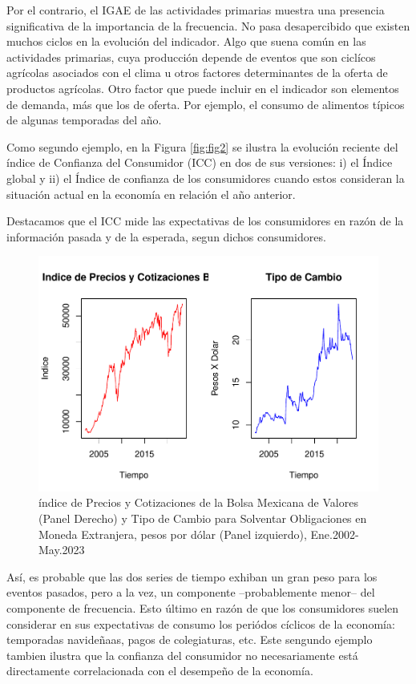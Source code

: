 \documentclass[
]{book}
\begin{document}
Por el contrario, el IGAE de las actividades primarias muestra una presencia significativa de la importancia de la frecuencia. No pasa desapercibido que existen muchos ciclos en la evolución del indicador. Algo que suena común
en las actividades primarias, cuya producción depende de eventos que son ciclícos agrícolas asociados con el clima u otros factores determinantes de la oferta de productos agrícolas. Otro factor que puede incluir en el indicador
son elementos de demanda, más que los de oferta. Por ejemplo, el consumo de alimentos típicos de algunas temporadas del año.

Como segundo ejemplo, en la Figura \ref{fig:fig2} se ilustra la evolución reciente del índice de Confianza del Consumidor (ICC) en dos de sus versiones: i) el Índice global y ii) el Índice de confianza de los consumidores cuando estos consideran la situación actual en la economía en relación el año anterior.

Destacamos que el ICC mide las expectativas de los consumidores en razón de la información pasada y de la esperada, segun dichos consumidores.

\begin{figure}

{\centering \includegraphics{bookdown-demo_files/figure-latex/fig3-1} 

}

\caption{índice de Precios y Cotizaciones de la Bolsa Mexicana de Valores (Panel Derecho) y Tipo de Cambio para Solventar Obligaciones en Moneda Extranjera, pesos por dólar (Panel izquierdo), Ene.2002-May.2023}\label{fig:fig3}
\end{figure}

Así, es probable que las dos series de tiempo exhiban un gran peso para los eventos pasados, pero a la vez, un componente --probablemente menor-- del componente de frecuencia. Esto último en razón de que los consumidores suelen considerar en sus expectativas de consumo los periódos cíclicos de la economía: temporadas navideñaas, pagos de colegiaturas, etc. Este sengundo ejemplo tambien ilustra que la confianza del consumidor no necesariamente está directamente correlacionada con el desempeño de la economía.
\end{document}
